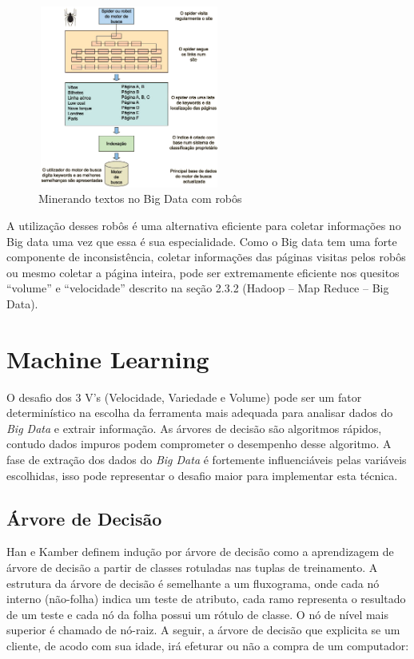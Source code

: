 \begin{figure}[!ht]
\centering
\caption{Minerando textos no Big Data com robôs}
\includegraphics[width=60mm, height=60mm]{Figuras/BigData/Motordebusca.png}
\end{figure}

A utilização desses robôs é uma alternativa eficiente para coletar informações no Big data uma vez que essa é sua especialidade. 
Como o Big data tem uma forte componente de inconsistência, coletar informações das páginas visitas pelos robôs ou mesmo coletar a página inteira, pode ser 
extremamente eficiente nos quesitos ``volume'' e ``velocidade'' descrito na seção 2.3.2 (Hadoop -- Map Reduce -- Big Data). 


\section{Machine Learning}\label{arte:palavraChave:Machine}

O desafio dos 3 V's (Velocidade, Variedade e Volume) pode ser um fator determinístico na escolha da ferramenta mais adequada para analisar dados do \textit{Big Data} 
e extrair informação. As árvores de decisão são algoritmos rápidos, contudo dados impuros podem comprometer o desempenho desse algoritmo. A fase de extração dos dados do 
\textit{Big Data} é fortemente influenciáveis pelas variáveis escolhidas, \cite{DecisionTree} isso pode representar o desafio maior para implementar esta técnica. 


\subsection{Árvore de Decisão}

Han e Kamber \cite{DataMining} definem indução por árvore de decisão como a aprendizagem de árvore de decisão a partir de classes rotuladas nas tuplas de treinamento. 
A estrutura da árvore de decisão é semelhante a um fluxograma, onde cada nó interno (não-folha) indica um teste de atributo, cada ramo representa o resultado de um teste e 
cada nó da folha possui um rótulo de classe. O nó de nível mais superior é chamado de nó-raiz.
A seguir, a árvore de decisão que explicita se um cliente, de acodo com sua idade, irá efeturar ou não a compra de um computador:

